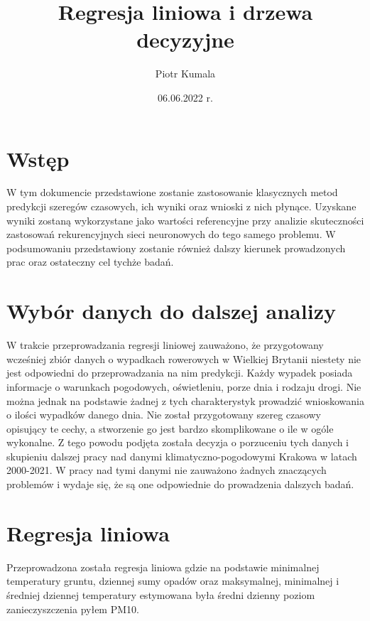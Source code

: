 \documentclass{article}
\title{Regresja liniowa i drzewa decyzyjne}
\author{Piotr Kumala}
\date{06.06.2022 r.}
\begin{document}
	
	\maketitle
	
	\section{Wstęp}
	W tym dokumencie przedstawione zostanie zastosowanie klasycznych metod predykcji szeregów czasowych, ich wyniki oraz wnioski z nich płynące. Uzyskane wyniki zostaną wykorzystane jako wartości referencyjne przy analizie skuteczności zastosowań rekurencyjnych sieci neuronowych do tego samego problemu. W podsumowaniu przedstawiony zostanie również dalszy kierunek prowadzonych prac oraz ostateczny cel tychże badań. 
	
	\section{Wybór danych do dalszej analizy}
	W trakcie przeprowadzania regresji liniowej zauważono, że przygotowany wcześniej zbiór danych o wypadkach rowerowych w Wielkiej Brytanii niestety nie jest odpowiedni do przeprowadzania na nim predykcji. Każdy wypadek posiada informacje o warunkach pogodowych, oświetleniu, porze dnia i rodzaju drogi. Nie można jednak na podstawie żadnej z tych charakterystyk prowadzić wnioskowania o ilości wypadków danego dnia. Nie został przygotowany szereg czasowy opisujący te cechy, a stworzenie go jest bardzo skomplikowane o ile w ogóle wykonalne. 
	Z tego powodu podjęta została decyzja o porzuceniu tych danych i skupieniu dalszej pracy nad danymi klimatyczno-pogodowymi Krakowa w latach 2000-2021. W pracy nad tymi danymi nie zauważono żadnych znaczących problemów i wydaje się, że są one odpowiednie do prowadzenia dalszych badań. 
	
	
	\section{Regresja liniowa}
	Przeprowadzona została regresja liniowa gdzie na podstawie minimalnej temperatury gruntu, dziennej sumy opadów oraz maksymalnej, minimalnej i średniej dziennej temperatury estymowana była średni dzienny poziom zanieczyszczenia pyłem PM10. 
	
\end{document}

